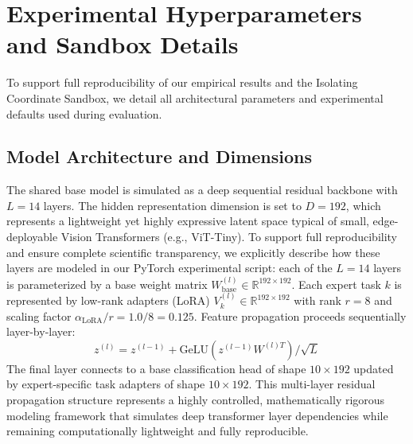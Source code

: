 \documentclass{article}
\theoremstyle{plain}
\theoremstyle{definition}
\theoremstyle{remark}
\begin{document}










\newpage
\appendix
\onecolumn
\section{Experimental Hyperparameters and Sandbox Details}
\label{sec:appendix}

To support full reproducibility of our empirical results and the Isolating Coordinate Sandbox, we detail all architectural parameters and experimental defaults used during evaluation.

\subsection{Model Architecture and Dimensions}
The shared base model is simulated as a deep sequential residual backbone with $L = 14$ layers.
The hidden representation dimension is set to $D = 192$, which represents a lightweight yet highly expressive latent space typical of small, edge-deployable Vision Transformers (e.g., ViT-Tiny).
To support full reproducibility and ensure complete scientific transparency, we explicitly describe how these layers are modeled in our PyTorch experimental script: each of the $L = 14$ layers is parameterized by a base weight matrix $W_{\text{base}}^{(l)} \in \mathbb{R}^{192 \times 192}$.
Each expert task $k$ is represented by low-rank adapters (LoRA) $V_k^{(l)} \in \mathbb{R}^{192 \times 192}$ with rank $r = 8$ and scaling factor $\alpha_{\text{LoRA}} / r = 1.0 / 8 = 0.125$.
Feature propagation proceeds sequentially layer-by-layer:
\begin{equation}
    z^{(l)} = z^{(l-1)} + \text{GeLU}\left(z^{(l-1)} W^{(l)T}\right) / \sqrt{L}
\end{equation}
The final layer connects to a base classification head of shape $10 \times 192$ updated by expert-specific task adapters of shape $10 \times 192$.
This multi-layer residual propagation structure represents a highly controlled, mathematically rigorous modeling framework that simulates deep transformer layer dependencies while remaining computationally lightweight and fully reproducible.
\end{document}

